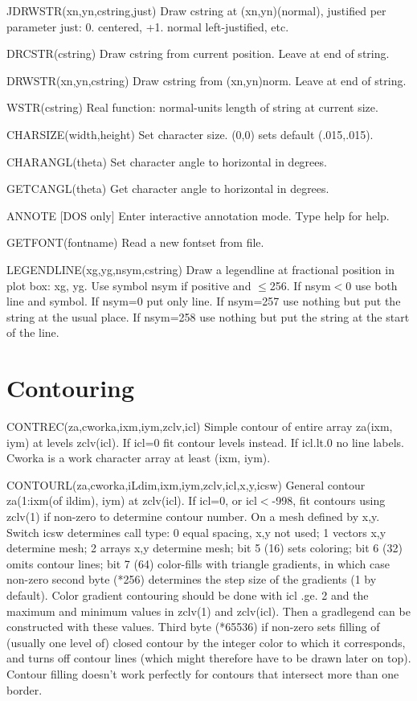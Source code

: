\documentclass[12pt]{article}
\newif \iftth
\begin{document}
JDRWSTR(xn,yn,cstring,just) Draw cstring at (xn,yn)(normal), justified
per parameter just:  0. centered, +1. normal left-justified, etc.

DRCSTR(cstring) Draw cstring from current position. Leave at end of string.

DRWSTR(xn,yn,cstring) Draw cstring from (xn,yn)norm. Leave at end of
string.

WSTR(cstring) Real function: normal-units length of string at current size.

CHARSIZE(width,height) Set character size. (0,0) sets default (.015,.015).

CHARANGL(theta) Set character angle to horizontal in degrees.

GETCANGL(theta) Get character angle to horizontal in degrees.

ANNOTE [DOS only] Enter interactive annotation mode. Type help for help.

GETFONT(fontname) Read a new fontset from file.

LEGENDLINE(xg,yg,nsym,cstring) Draw a legendline at fractional
position in plot box: xg, yg.  Use symbol nsym if positive and $\le$256.
If nsym$<$0 use both line and symbol. If nsym=0 put only line.  
If nsym=257 use nothing but put the string at the usual place.
If nsym=258 use nothing but put the string at the start of the line.

\section{Contouring}

\iftth \special{html:<a href="contest.f"><img align="right" src="contest.png"></a>}\fi

CONTREC(za,cworka,ixm,iym,zclv,icl) Simple contour of entire array za(ixm, iym)
at levels zclv(icl). If icl=0 fit contour levels instead. If icl.lt.0 no
line labels. Cworka is a work character array at least (ixm, iym).

CONTOURL(za,cworka,iLdim,ixm,iym,zclv,icl,x,y,icsw) General contour
za(1:ixm(of ildim), iym) at zclv(icl). If icl=0, or icl$<$-998, fit
contours using zclv(1) if non-zero to determine contour number. On a
mesh defined by x,y. Switch icsw determines call type: 0 equal
spacing, x,y not used; 1 vectors x,y determine mesh; 2 arrays x,y
determine mesh; bit 5 (16) sets coloring; bit 6 (32) omits contour
lines; bit 7 (64) color-fills with triangle gradients, in which case
non-zero second byte (*256) determines the step size of the gradients
(1 by default). Color gradient contouring should be done with icl
.ge. 2 and the maximum and minimum values in zclv(1) and
zclv(icl). Then a gradlegend can be constructed with these values.
Third byte (*65536) if non-zero sets filling of (usually one level of)
closed contour by the integer color to which it corresponds, and turns
off contour lines (which might therefore have to be drawn later on
top). Contour filling doesn't work perfectly for contours that
intersect more than one border.
\end{document}
